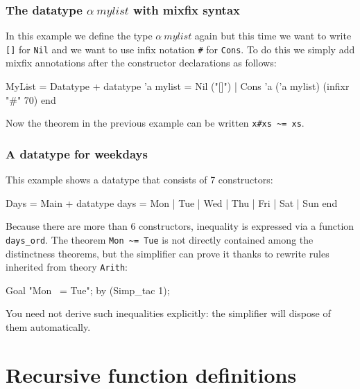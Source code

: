 \subsubsection{The datatype $\alpha~mylist$ with mixfix syntax}

In this example we define the type $\alpha~mylist$ again but this time
we want to write \texttt{[]} for \texttt{Nil} and we want to use infix
notation \verb|#| for \texttt{Cons}.  To do this we simply add mixfix
annotations after the constructor declarations as follows:
\begin{ttbox}
MyList = Datatype +
  datatype 'a mylist =
    Nil ("[]")  |
    Cons 'a ('a mylist)  (infixr "#" 70)
end
\end{ttbox}
Now the theorem in the previous example can be written \verb|x#xs ~= xs|.


\subsubsection{A datatype for weekdays}

This example shows a datatype that consists of 7 constructors:
\begin{ttbox}
Days = Main +
  datatype days = Mon | Tue | Wed | Thu | Fri | Sat | Sun
end
\end{ttbox}
Because there are more than 6 constructors, inequality is expressed via a function
\verb|days_ord|.  The theorem \verb|Mon ~= Tue| is not directly
contained among the distinctness theorems, but the simplifier can
prove it thanks to rewrite rules inherited from theory \texttt{Arith}:
\begin{ttbox}
Goal "Mon ~= Tue";
by (Simp_tac 1);
\end{ttbox}
You need not derive such inequalities explicitly: the simplifier will dispose
of them automatically.


\section{Recursive function definitions}\label{sec:HOL:recursive}

